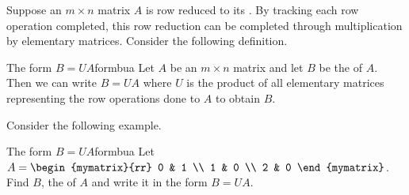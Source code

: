 Suppose an $m \times n$ matrix $A$ is row reduced to its {\rref}. By tracking each row operation completed, this row reduction can be completed through multiplication by elementary matrices. Consider the following definition.

\begin{definition}{The form $B=UA$}{formbua}
Let $A$ be an $m \times n$ matrix and let $B$ be the {\rref} of $A$. Then we can write $B = UA$ where $U$ is the product of all elementary matrices representing the row operations done to $A$ to obtain $B$. 
\end{definition}

Consider the following example.

\begin{example}{The form $B=UA$}{formbua}
Let $A = \begin{mymatrix}{rr}
0 & 1 \\
1 & 0 \\
2 & 0
\end{mymatrix}$. Find $B$, the {\rref} of $A$ and write it in the form $B=UA$.
\end{example}

